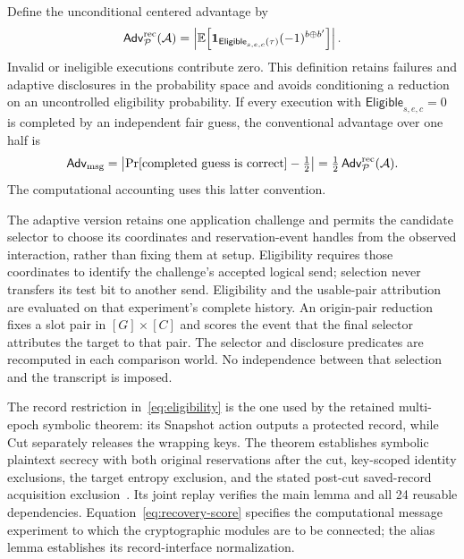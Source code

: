 Define the unconditional centered advantage by
\begin{equation}
 \mathsf{Adv}^{\rm rec}_{\mathcal P}(\mathcal A)
   =
 \left|
   \mathbb E\!\left[
    \mathbf 1_{\mathsf{Eligible}_{s,e,c}(\tau)}
                       (-1)^{b\oplus b'}\right]
 \right|.
 \label{eq:recovery-score}
\end{equation}
Invalid or ineligible executions contribute zero.  This definition retains
failures and adaptive disclosures in the probability space and avoids
conditioning a reduction on an uncontrolled eligibility probability.
If every execution with $\mathsf{Eligible}_{s,e,c}=0$ is completed by an
independent fair guess, the conventional advantage over one half is
\[
 \mathsf{Adv}_{\rm msg}
   =\left|\Pr[\text{completed guess is correct}]-\tfrac12\right|
   =\tfrac12\,\mathsf{Adv}^{\rm rec}_{\mathcal P}(\mathcal A).
\]
The computational accounting uses this latter convention.

The adaptive version retains one application challenge and permits the
candidate selector to choose its coordinates and reservation-event handles
from the observed interaction, rather than fixing them at setup.  Eligibility
requires those coordinates to identify the challenge's accepted logical send;
selection never transfers its test bit to another send.  Eligibility
and the usable-pair attribution are evaluated on that experiment's complete
history.  An origin-pair reduction fixes a slot pair in $[G]\times[C]$ and
scores the event that the final selector attributes the target to that pair.
The selector and disclosure predicates are recomputed in each comparison
world.  No independence between that selection and the transcript is imposed.

The record restriction in~\eqref{eq:eligibility} is the one used by the
retained multi-epoch symbolic theorem: its \textsf{Snapshot} action outputs
a protected record, while \textsf{Cut} separately releases the wrapping keys.
The theorem establishes symbolic plaintext secrecy with both original
reservations after the cut, key-scoped identity exclusions, the target
entropy exclusion, and the stated post-cut saved-record acquisition
exclusion~\cite{qperiaptSymbolic2026}.  Its joint replay verifies the main
lemma and all 24 reusable dependencies.  Equation~\eqref{eq:recovery-score}
specifies the computational message experiment to which the cryptographic
modules are to be connected; the alias lemma establishes its record-interface
normalization.

